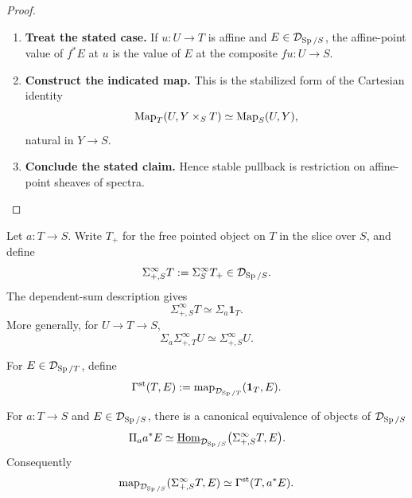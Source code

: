 \begin{proof}
\leavevmode
\begin{enumerate}[label=\textup{(\arabic*)}]
    \item \textbf{Treat the stated case.}
    If \(u:U\to T\) is affine and \(E\in\mathcal D_{\operatorname{Sp}/S}\), the affine-point
    value of \(f^*E\) at \(u\) is the value of \(E\) at the composite
    \(fu:U\to S\).
    \item \textbf{Construct the indicated map.}
    This is the stabilized form of the Cartesian identity
    \[
    \operatorname{Map}_T(U,Y\times_ST)\simeq\operatorname{Map}_S(U,Y),
    \]
    natural in \(Y\to S\).
    \item \textbf{Conclude the stated claim.}
    Hence stable pullback is restriction on affine-point
    sheaves of spectra.
\end{enumerate}
\end{proof}

\begin{construction}
Let \(a:T\to S\). Write \(T_+\) for the free pointed object on \(T\) in the
slice over \(S\), and define
\[
  \Sigma^\infty_{+,S}T
  :=
  \Sigma^\infty_ST_+\in\mathcal D_{\operatorname{Sp}/S}.
\]
The dependent-sum description gives
\[
  \Sigma^\infty_{+,S}T
  \simeq
  \Sigma_a\mathbf1_T.
\]
More generally, for \(U\to T\to S\),
\[
  \Sigma_a\Sigma^\infty_{+,T}U
  \simeq
  \Sigma^\infty_{+,S}U.
\]
\end{construction}

\begin{definition}
For \(E\in\mathcal D_{\operatorname{Sp}/T}\), define
\[
  \Gamma^{\mathrm{st}}(T,E)
  :=
  \operatorname{map}_{\mathcal D_{\operatorname{Sp}/T}}(\mathbf1_T,E).
\]
\end{definition}

\begin{proposition}
\label{prop:function-spectrum-identity}
For \(a:T\to S\) and \(E\in\mathcal D_{\operatorname{Sp}/S}\), there is a canonical equivalence of
objects of \(\mathcal D_{\operatorname{Sp}/S}\)
\[
  \Pi_a a^*E
  \simeq
  \underline{\operatorname{Hom}}_{\mathcal D_{\operatorname{Sp}/S}}
  \bigl(\Sigma^\infty_{+,S}T,E\bigr).
\]
Consequently
\[
  \operatorname{map}_{\mathcal D_{\operatorname{Sp}/S}}(\Sigma^\infty_{+,S}T,E)
  \simeq
  \Gamma^{\mathrm{st}}(T,a^*E).
\]
\end{proposition}

